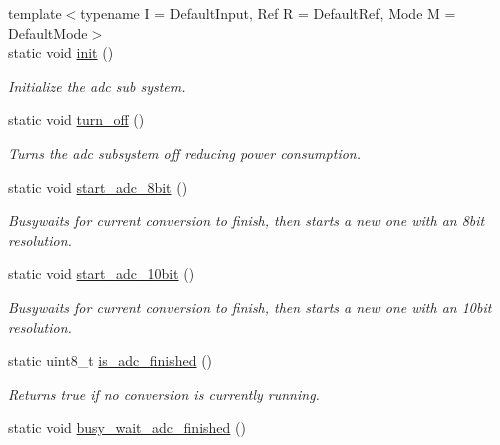 \begin{DoxyCompactItemize}
\item 
{\footnotesize template$<$typename I  = Default\+Input, Ref R = Default\+Ref, Mode M = Default\+Mode$>$ }\\static void \hyperlink{classadc_1_1Adc_ae453bb940554c62082776bd41a9053a3}{init} ()
\begin{DoxyCompactList}\small\item\em Initialize the adc sub system. \end{DoxyCompactList}\item 
static void \hyperlink{classadc_1_1Adc_adae69593a7798da99be0fa8ffaf09f06}{turn\+\_\+off} ()
\begin{DoxyCompactList}\small\item\em Turns the adc subsystem off reducing power consumption. \end{DoxyCompactList}\item 
static void \hyperlink{classadc_1_1Adc_acca97e4a4c6141505348f0bbfe6c1148}{start\+\_\+adc\+\_\+8bit} ()
\begin{DoxyCompactList}\small\item\em Busywaits for current conversion to finish, then starts a new one with an 8bit resolution. \end{DoxyCompactList}\item 
static void \hyperlink{classadc_1_1Adc_aeab3739f2f541da1f3687f5d97b6f8c2}{start\+\_\+adc\+\_\+10bit} ()
\begin{DoxyCompactList}\small\item\em Busywaits for current conversion to finish, then starts a new one with an 10bit resolution. \end{DoxyCompactList}\item 
static uint8\+\_\+t \hyperlink{classadc_1_1Adc_ac469d58cc8c55dd3974d80d1445a4db7}{is\+\_\+adc\+\_\+finished} ()\hypertarget{classadc_1_1Adc_ac469d58cc8c55dd3974d80d1445a4db7}{}\label{classadc_1_1Adc_ac469d58cc8c55dd3974d80d1445a4db7}

\begin{DoxyCompactList}\small\item\em Returns true if no conversion is currently running. \end{DoxyCompactList}\item 
static void \hyperlink{classadc_1_1Adc_a0974180ce659bd3bff9499666e653eeb}{busy\+\_\+wait\+\_\+adc\+\_\+finished} ()\hypertarget{classadc_1_1Adc_a0974180ce659bd3bff9499666e653eeb}{}\label{classadc_1_1Adc_a0974180ce659bd3bff9499666e653eeb}


\end{DoxyCompactItemize}
